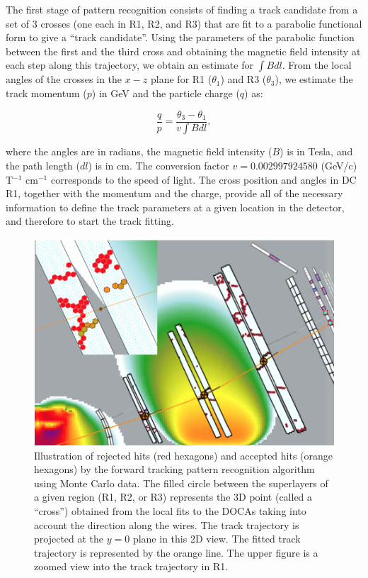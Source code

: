 The first stage of pattern recognition consists of finding a track candidate from a set of 3 crosses (one each in R1,
R2, and R3) that are fit to a parabolic functional form to give a ``track candidate''. Using the parameters of the
parabolic function between the first and the third cross and obtaining the magnetic field intensity at each step along
this trajectory, we obtain an estimate for $\int \!\!B dl$. From the local angles of the crosses in the $x-z$ plane for
R1 ($\theta_1$) and R3 ($\theta_3$), we estimate the track momentum {\color{red} ($p$) in GeV} and the particle charge ($q$) as:

\begin{equation}
  \frac{q}{p} = \frac{\theta_3 - \theta_1}{v \int \!\!B dl},
\end{equation}

\noindent
where the angles are in radians, the magnetic field intensity ($B$) is in Tesla, and the path length ($dl$) is in cm.
{\color{red} The conversion factor  $v = 0.002997924580$ (GeV/c) T$^{-1}$ cm$^{-1}$  corresponds to the speed of light}. The cross position and angles in DC R1, together with
the momentum and the charge, provide all of the necessary information to define the track parameters at a given
location in the detector, and therefore to start the track fitting.

\begin{figure}[t]
\centering
\includegraphics[width=0.9\columnwidth]{pics/dcPattern13.png}
\caption{Illustration of rejected hits (red hexagons) and accepted hits (orange hexagons) by the forward tracking
  pattern recognition algorithm using Monte Carlo data. The filled circle between the superlayers of a given region (R1,
  R2, or R3) represents the 3D point (called a ``cross'') obtained from the local fits to the DOCAs taking into account
  the direction along the wires. The track trajectory is projected at the $y=0$ plane in this 2D view. The fitted track
  trajectory is represented by the orange line. The upper figure is a zoomed view into the track trajectory in R1.}
\label{fig:dcsegs}
\end{figure}

